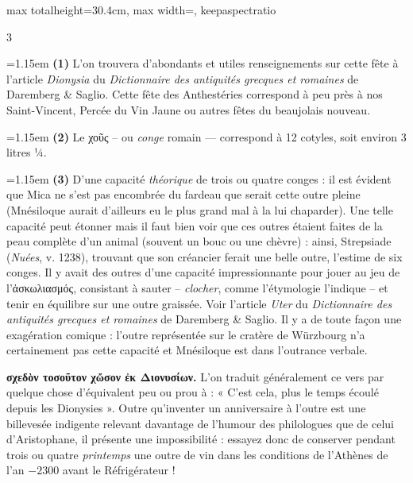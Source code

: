 \documentclass[11pt,twoside]{book}
\newcommand{\italique}[1]{\textit{#1}}
\newcommand{\grec}[1]{{\policeGr #1}}
\newcommand{\latin}[1]{\textit{#1}}
\begin{document}
\begin{adjustbox}{max totalheight=30.4cm, max width=\textwidth, keepaspectratio}
\begin{minipage}{\textwidth}
{\begin{multicols}{3}
\par\vspace{1.2pt}\par\nopagebreak\vspace{1pt}\noindent\hangindent=1.15em {\color{sepiaNote}\textbf{(1)}} L'on trouvera d'abondants et utiles renseignements sur cette fête à l'article \latin{Dionysia} du \italique{Dictionnaire des antiquités grecques et romaines} de Daremberg \& Saglio. Cette fête des Anthestéries correspond à peu près à nos Saint-Vincent, Percée du Vin Jaune ou autres fêtes du beaujolais nouveau.
\par\vspace{1.5pt}
\noindent\hangindent=1.15em {\color{sepiaNote}\textbf{(2)}} Le \grec{χοῦς} – ou \italique{conge} romain — correspond à 12 cotyles, soit environ 3 litres ¼.
\par\vspace{1.5pt}
\noindent\hangindent=1.15em {\color{sepiaNote}\textbf{(3)}} D'une capacité \italique{théorique} de trois ou quatre conges : il est évident que Mica ne s'est pas encombrée du fardeau que serait cette outre pleine (Mnésiloque aurait d'ailleurs eu le plus grand mal à la lui chaparder). Une telle capacité peut étonner mais il faut bien voir que ces outres étaient faites de la peau complète d'un animal (souvent un bouc ou une chèvre) : ainsi, Strepsiade (\italique{Nuées}, v. 1238), trouvant que son créancier ferait une belle outre, l'estime de six conges. Il y avait des outres d'une capacité impressionnante pour jouer au jeu de l'\grec{ἀσκωλιασμός}, consistant à sauter -- \italique{clocher}, comme l'étymologie l'indique -- et tenir en équilibre sur une outre graissée. Voir l'article \latin{Uter} du \italique{Dictionnaire des antiquités grecques et romaines} de Daremberg \& Saglio. Il y a de toute façon une exagération comique : l'outre représentée sur le cratère de Würzbourg n'a certainement pas cette capacité et Mnésiloque est dans l'outrance verbale.
\par\vspace{1.5pt}
 \textbf{σχεδὸν τοσοῦτον χὤσον ἐκ Διονυσίων.} L'on traduit généralement ce vers par quelque chose d'équivalent peu ou prou à : « C'est cela, plus le temps écoulé depuis les Dionysies ». Outre qu'inventer un anniversaire à l'outre est une billevesée indigente relevant davantage de l'humour des philologues que de celui d'Aristophane, il présente une impossibilité : essayez donc de conserver pendant trois ou quatre \italique{printemps} une outre de vin dans les conditions de l'Athènes de l'an $-2300$ avant le Réfrigérateur !

\end{multicols}}
\end{minipage}
\end{adjustbox}
\end{document}
